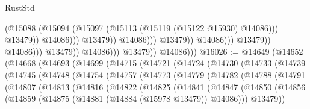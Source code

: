 \begin{lexlean}{RustStd}
\begin{coremodule}
                                                            (@15088
                                                              (@15094
                                                                (@15097
                                                                  (@15113
                                                                    (@15119
                                                                      (@15122 @15930)
                                                                      @14086)))
                                                                @13479))
                                                            @14086)))
                                                      @13479))
                                                  @14086)))
                                            @13479))
                                        @14086)))
                                  @13479))
                              @14086)))
                        @13479))
                    @14086)))
              @13479))
          @14086)))
@16026 := @14649
    (@14652
      (@14668
        (@14693
          (@14699
            (@14715
              (@14721
                (@14724
                  (@14730
                    (@14733
                      (@14739
                        (@14745
                          (@14748
                            (@14754
                              (@14757
                                (@14773
                                  (@14779
                                    (@14782
                                      (@14788
                                        (@14791
                                          (@14807
                                            (@14813
                                              (@14816
                                                (@14822
                                                  (@14825
                                                    (@14841
                                                      (@14847
                                                        (@14850
                                                          (@14856
                                                            (@14859
                                                              (@14875
                                                                (@14881
                                                                  (@14884 (@15978 @13479))
                                                                  @14086)))
                                                            @13479))

\end{coremodule}
\end{lexlean}
